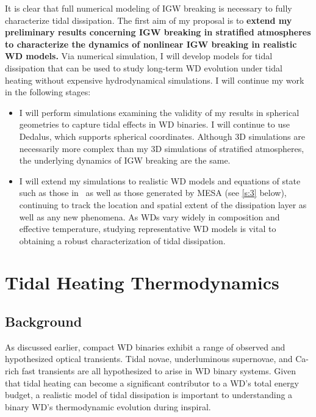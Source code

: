 \documentclass[12pt,
        usenames, %
        dvipsnames %
    ]{article}
\begin{document}
It is clear that full numerical modeling of IGW breaking is necessary to fully
characterize tidal dissipation. The first aim of my proposal is to
\textbf{extend my preliminary results concerning IGW breaking in stratified
atmospheres to characterize the dynamics of nonlinear IGW breaking in realistic
WD models.} Via numerical simulation, I will develop models for tidal
dissipation that can be used to study long-term WD evolution under tidal heating
without expensive hydrodynamical simulations. I will continue my work in the
following stages:
\begin{itemize}
    \item I will perform simulations examining the validity of my results in
        spherical geometries to capture tidal effects in WD binaries. I will
        continue to use Dedalus, which supports spherical coordinates. Although
        3D simulations are necessarily more complex than my 3D simulations of
        stratified atmospheres, the underlying dynamics of IGW breaking are the
        same.

    \item I will extend my simulations to realistic WD models and equations of
        state such as those in~\cite{brassard1992} as well as those generated by
        MESA (see \autoref{s:3} below), continuing to track the location and
        spatial extent of the dissipation layer as well as any new phenomena. As
        WDs vary widely in composition and effective temperature, studying
        representative WD models is vital to obtaining a robust characterization
        of tidal dissipation.
\end{itemize}

\section{Tidal Heating Thermodynamics}\label{s:3}

\subsection{Background}

As discussed earlier, compact WD binaries exhibit a range of observed and
hypothesized optical transients. Tidal novae\cite{tidal_novae}, underluminous
supernovae\cite{underlum}, and Ca-rich fast transients\cite{carich} are all
hypothesized to arise in WD binary systems. Given that tidal heating can become
a significant contributor to a WD's total energy budget, a realistic model of
tidal dissipation is important to understanding a binary WD's thermodynamic
evolution during inspiral.
\end{document}
